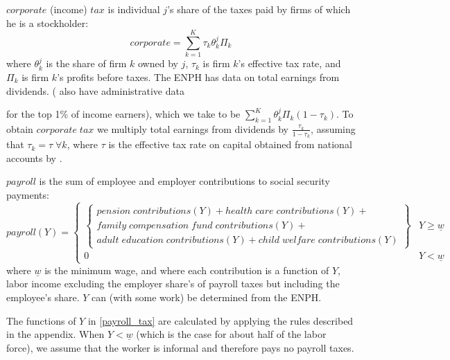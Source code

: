 \documentclass[12pt]{article}
\begin{document}
$corporate$ (income) $tax$ is individual $j$'s share of
the taxes paid by firms of which he is a stockholder:
\begin{equation}
corporate = \sum^{K}_{k=1} \tau_k\theta^j_k\Pi_k
\end{equation}
where $\theta^j_k$ is the share of firm $k$ owned by $j$,
$\tau_k$ is firm $k$'s effective tax rate,
and $\Pi_k$ is firm $k$'s profits before taxes.
The ENPH has data on total earnings from dividends.
(\citet{juliana} also have administrative data
\iffalse
    [[AN ECONOMIST:
        Who is juliana? That string only appears cited in this document,
        but the citation is never defined. --jbb]]
\fi
for the top 1\% of income earners),
which we take to be $\sum^{K}_{k=1} \theta^j_k\Pi_k(1-\tau_k)$.
To obtain $corporate \;tax$ we multiply total earnings from dividends by
$\frac{\tau_k}{1-\tau_k}$,
assuming that $\tau_k=\tau \; \forall k$,
where $\tau$ is the effective tax rate on capital
obtained from national accounts by \citet{banrep}.
\iffalse
[[AN ECONOMIST:
    I'm unaware of any place in the code that does this,
    and pretty sure that's because there isn't one.
    Maybe Luis Carlos Reyes or David Suarez was computing it by hand.
    --jbb]]

[[ AN ECONOMIST:
    What document is that ``banrep'' citation supposed to cite?
    It's not defined anywhere.
    --jbb]]
\fi

$payroll$ is the sum of employee and employer contributions to social security payments:
\begin{equation}
  payroll(Y) = \begin{cases}
    \left\{ \begin{array}{cc}
      pension \;contributions(Y) +
      health \;care \;contributions(Y) + \\
      family \;compensation \;fund \;contributions(Y) + \\
      adult \;education \;contributions(Y) +
      child \;welfare \;contributions(Y)
    \end{array} \right\}
    & Y \geq \underline{w} \\
    0 & Y < \underline{w}
    \end{cases}
\end{equation}
where $\underline{w}$ is the minimum wage,
and where each contribution is a function of $Y$,
labor income excluding the employer share's of payroll taxes
but including the employee's share.
$Y$ can (with some work) be determined from the ENPH.
\iffalse JEFF: RESUME HERE (mid-paragraph) \fi
The functions of $Y$ in \ref{payroll_tax} are calculated by
applying the rules described in the appendix.
When $Y < \underline{w}$
(which is the case for about half of the labor force),
we assume that the worker is informal and therefore pays no payroll taxes.
\end{document}
